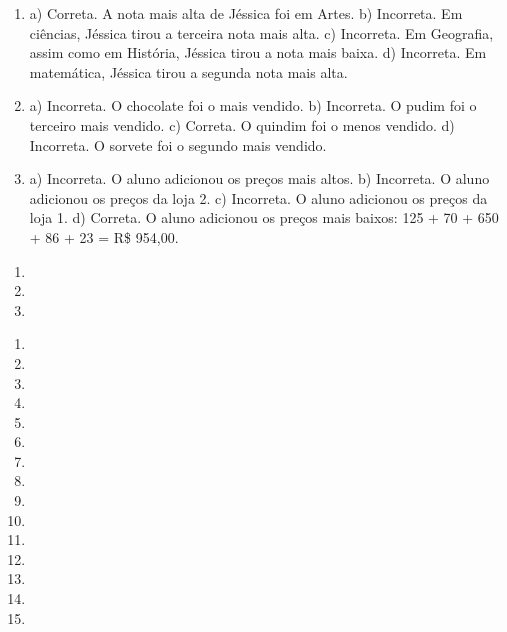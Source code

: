 
\begin{enumerate}
\item
a) Correta. A nota mais alta de Jéssica foi em Artes.
b) Incorreta. Em ciências, Jéssica tirou a terceira nota mais alta.
c) Incorreta. Em Geografia, assim como em História, Jéssica tirou a nota mais baixa.
d) Incorreta. Em matemática, Jéssica tirou a segunda nota mais alta.

\item
a) Incorreta. O chocolate foi o mais vendido.
b) Incorreta. O pudim foi o terceiro mais vendido.
c) Correta. O quindim foi o menos vendido.
d) Incorreta. O sorvete foi o segundo mais vendido.

\item
a) Incorreta. O aluno adicionou os preços mais altos.
b) Incorreta. O aluno adicionou os preços da loja 2.
c) Incorreta. O aluno adicionou os preços da loja 1.
d) Correta. O aluno adicionou os preços mais baixos: 125 + 70 + 650 + 86 + 23 = R\$ 954,00.
\end{enumerate}


\begin{enumerate}
\item

\item

\item
\end{enumerate}


\begin{enumerate}
\item

\item

\item

\item

\item

\item

\item

\item

\item

\item

\item

\item

\item

\item

\item
\end{enumerate}


